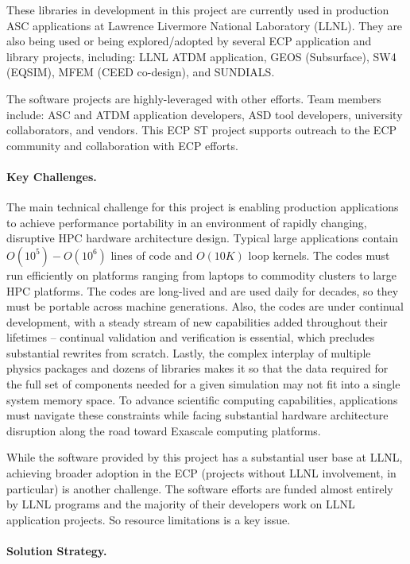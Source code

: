 These libraries in development in this project are currently used in 
production ASC applications at Lawrence Livermore National Laboratory 
(LLNL). They are also being used or being explored/adopted by several ECP 
application and library projects, including: LLNL ATDM application, GEOS (Subsurface), SW4 (EQSIM), MFEM (CEED co-design), and SUNDIALS.

The software projects are highly-leveraged with other efforts. Team members 
include: ASC and ATDM application developers, ASD tool developers, university 
collaborators, and vendors. This ECP ST project supports outreach to the ECP
community and collaboration with ECP efforts.

\paragraph{Key Challenges.}

The main technical challenge for this project is enabling production
applications to achieve performance portability in an environment of rapidly 
changing, disruptive HPC hardware architecture design. Typical large 
applications contain $O(10^5) - O(10^6)$ lines of code and $O(10K)$ loop 
kernels. The codes must run efficiently on platforms ranging from 
laptops to commodity clusters to large HPC platforms. The codes are 
long-lived and are used daily for decades, so they must be portable across 
machine generations. Also, the codes are under continual development, with a 
steady stream of new capabilities added throughout their lifetimes -- continual 
validation and verification is essential, which precludes substantial rewrites
from scratch. Lastly, the complex interplay of multiple physics packages 
and dozens of libraries makes it so that the data required for the full set of 
components needed for a given simulation may not fit into a single system
memory space. To advance scientific computing capabilities, applications 
must navigate these constraints while facing substantial hardware architecture 
disruption along the road toward Exascale computing platforms. 

While the software provided by this project has a substantial user base at
LLNL, achieving broader adoption in the ECP (projects without LLNL involvement, 
in particular) is another challenge. The software efforts are funded almost 
entirely by LLNL programs and the majority of their developers work on LLNL 
application projects. So resource limitations is a key issue.

\paragraph{Solution Strategy.}

